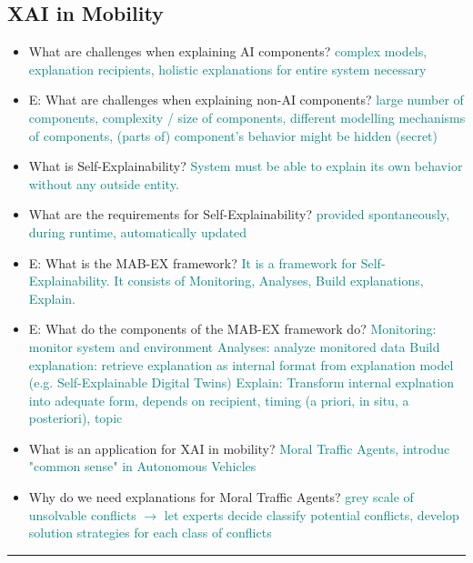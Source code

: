 \documentclass{report}
\newcommand{\asw}[2][teal]{}
\renewcommand{\asw}[2][teal]{\textcolor{#1}{#2}}
\begin{document}
		\subsection{XAI in Mobility}
		
		\begin{itemize}
		\item What are challenges when explaining AI components?
		\asw{\newline complex models, explanation recipients, holistic explanations for entire system necessary}
		\item E: What are challenges when explaining non-AI components?
		\asw{\newline large number of components, complexity / size of components, different modelling mechanisms of components, (parts of) component's behavior might be hidden (secret)}
		\item What is Self-Explainability?
		\asw{\newline System must be able to explain its own behavior without any outside entity.}
		\item What are the requirements for Self-Explainability?
		\asw{\newline provided spontaneously, during runtime, automatically updated}
		\item E: What is the MAB-EX framework?
		\asw{\newline It is a framework for Self-Explainability. It consists of Monitoring, Analyses, Build explanations, Explain.}
		\item E: What do the components of the MAB-EX framework do?
		\asw{\newline Monitoring: monitor system and environment
			\newline Analyses: analyze monitored data
			\newline Build explanation: retrieve explanation as internal format from explanation model (e.g. Self-Explainable Digital Twins)
			\newline Explain: Transform internal explnation into adequate form, depends on recipient, timing (a priori, in situ, a posteriori), topic}
		\item What is an application for XAI in mobility?
		\asw{\newline Moral Traffic Agents, introduc "common sense" in Autonomous Vehicles}
		\item Why do we need explanations for Moral Traffic Agents?
		\asw{\newline grey scale of unsolvable conflicts $\rightarrow$ let experts decide
			\newline classify potential conflicts, develop solution strategies for each class of conflicts}
		\end{itemize}
		\hrule 
	
\end{document}
